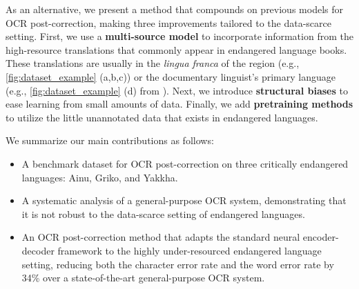 As an alternative, we present a method that compounds on previous models for OCR post-correction, making three improvements tailored to the data-scarce setting. First, we use a \textbf{multi-source model} to incorporate information from the high-resource translations that commonly appear in endangered language books. These translations are usually in the \textit{lingua franca} of the region (e.g., \autoref{fig:dataset_example} (a,b,c)) or the documentary linguist's primary language (e.g., \autoref{fig:dataset_example} (d) from \citet{shangaji-elar}). Next, we introduce \textbf{structural biases} to ease learning from small amounts of data. Finally, we add \textbf{pretraining methods} to utilize the little unannotated data that exists in endangered languages.

\medskip
\noindent
We summarize our main contributions as follows:
\begin{itemize}[leftmargin=*, itemsep=3pt]
    \item A benchmark dataset for OCR post-correction on three critically endangered languages: Ainu, Griko, and Yakkha.
    \item A systematic analysis of a general-purpose OCR system, demonstrating that it is not robust to the data-scarce setting of endangered languages.
    \item An OCR post-correction method that adapts the standard neural encoder-decoder framework to the highly under-resourced endangered language setting, reducing both the character error rate and the word error rate by 34\% over a state-of-the-art general-purpose OCR system.
\end{itemize}
